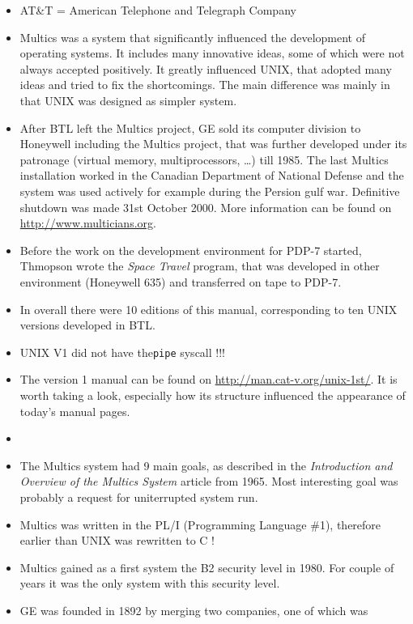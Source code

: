 \begin{itemize}
\item AT\&T = American Telephone and Telegraph Company
\item Multics was a system that significantly influenced the development of
operating systems. It includes many innovative ideas, some of which were not
always accepted positively. It greatly influenced UNIX, that adopted many ideas
and tried to fix the shortcomings. The main difference was mainly in that UNIX
was designed as simpler system.
\item After BTL left the Multics project, GE sold its computer division to
Honeywell including the Multics project, that was further developed under its
patronage (virtual memory, multiprocessors, \dots) till 1985.
The last Multics installation worked in the Canadian Department of National
Defense and the system was used actively for example during the Persion gulf
war. Definitive shutdown was made 31st October 2000. More information can be
found on \url{http://www.multicians.org}.
\item Before the work on the development environment for PDP-7 started, Thmopson
wrote the \emph{Space Travel} program, that was developed in other environment
(Honeywell 635) and transferred on tape to PDP-7.
\item In overall there were 10 editions of this manual, corresponding to ten
UNIX versions developed in BTL.
\item UNIX V1 did not have the\texttt{pipe} syscall !!!
\item The version 1 manual can be found on
\url{http://man.cat-v.org/unix-1st/}.
It is worth taking a look, especially how its structure influenced the
appearance of today's manual pages.
\item {}
\item The Multics system had 9 main goals, as described in the
\emph{Introduction and Overview of the Multics System} article from 1965.
Most interesting goal was probably a request for uniterrupted system run.
\item Multics was written in the PL/I (Programming Language \#1), therefore
earlier than UNIX was rewritten to C !
\item Multics gained as a first system the B2 security level in 1980.
For couple of years it was the only system with this security level.
\item GE was founded in 1892 by merging two companies, one of which was

\end{itemize}
